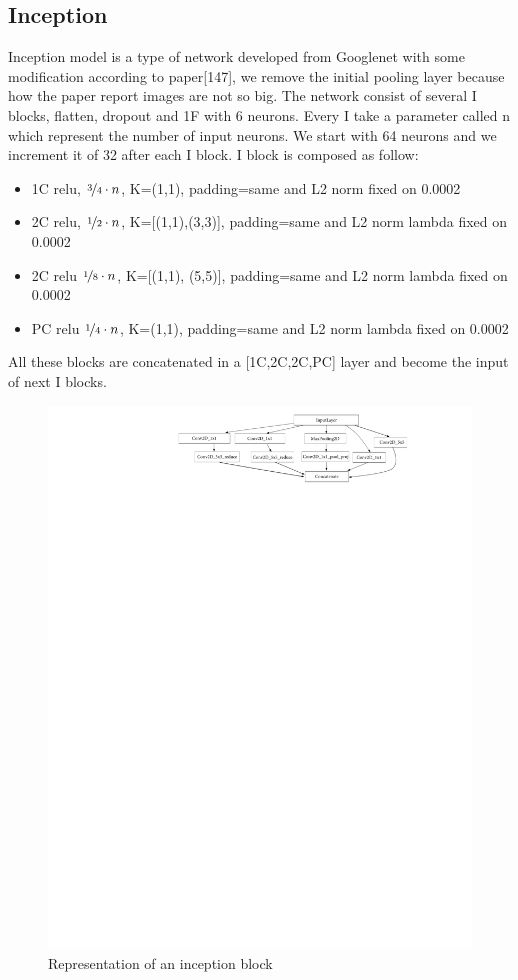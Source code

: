 \documentclass[10pt,twocolumn,letterpaper]{article}
\begin{document}
\subsection*{Inception}
Inception model is a type of network developed from Googlenet \cite{13} with some modification according to paper[147], we remove the initial pooling layer because how the paper report \cite{147} images are not so big. 
The network consist of several I blocks, flatten, dropout and 1F with 6 neurons. Every I take a parameter called n which represent the number of input neurons. 
We start with 64 neurons and we increment it of 32 after each I block. I block is composed as follow:
\begin{itemize}[noitemsep]%
\item 1C relu, $\nicefrac{3}{4}\cdot n$, K=(1,1), padding=same and L2 norm fixed on 0.0002
\item 2C relu, $\nicefrac{1}{2}\cdot n$, K=[(1,1),(3,3)], padding=same and L2 norm lambda fixed on 0.0002
\item 2C relu $\nicefrac{1}{8}\cdot n$, K=[(1,1), (5,5)], padding=same and L2 norm lambda fixed on 0.0002
\item PC relu $\nicefrac{1}{4}\cdot n$, K=(1,1), padding=same and L2 norm lambda fixed on 0.0002
\end{itemize}
All these blocks are concatenated in a [1C,2C,2C,PC] layer and become the input of next I blocks.
\begin{figure}[h]
   \centering
   \includegraphics[width=1\linewidth]{./immagini/m_inception_v0.pdf}
   \caption{Representation of an inception block}
\end{figure}
\end{document}
